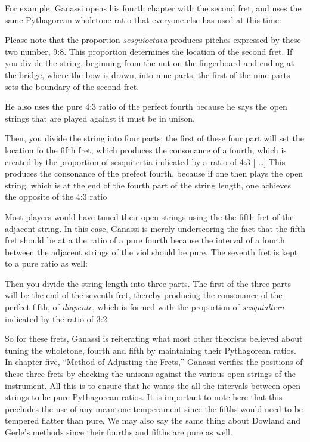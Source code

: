 For example, Ganassi opens his fourth chapter with the second fret, and uses the same
Pythagorean wholetone ratio that everyone else has used at this time:
\begin{blocks}
Please note that the proportion \emph{sesquioctava} produces pitches expressed
by these two number, 9:8.  This proportion determines the location of the second
fret.  If you divide the string, beginning from the nut on the fingerboard and
ending at the bridge, where the bow is drawn, into nine parts, the first of the
nine parts sets the boundary of the second fret.
\end{blocks}
He also uses the pure 4:3 ratio of the
perfect fourth because he says the open strings that are played against it must
be in unison.
\begin{blocks}
Then, you divide the string into four parts; the first of these four part will
set the location fo the fifth fret, which produces the consonance of a fourth,
which is created by the proportion of sesquitertia indicated by a ratio of 4:3
[ \ldots ] This produces the consonance of the prefect fourth, because if
one then plays the open string, which is at the end of the fourth part of the
string length, one achieves the opposite of the 4:3 ratio
\end{blocks}
Most players would have tuned their open strings using the the fifth fret of the
adjacent string.  In this case, Ganassi is merely underscoring the fact that the fifth
fret should be at a the ratio of a pure fourth because the interval of a fourth between
the adjacent strings of the viol should be pure. The seventh fret is kept to a pure
ratio as well:
\begin{blocks}
Then you divide the string length into three parts. The first of the three parts will
be the end of the seventh fret, thereby producing the consonance of the perfect fifth,
of \textit{diapente}, which is formed with the proportion of \textit{sesquialtera}
indicated by the ratio of 3:2.
\end{blocks}

So for these frets, Ganassi is reiterating what most other theorists believed about
tuning the wholetone, fourth and fifth by maintaining their Pythagorean ratios. In
chapter five, ``Method of Adjusting the Frets,'' Ganassi verifies the positions of
these three frets by checking the unisons against the various open strings of the
instrument.  All this is to ensure that he wants the all the intervals between open
strings to be pure Pythagorean ratios.  It is important to note here that this
precludes the use of any meantone temperament since the fifths would need to be
tempered flatter than pure.  We may also say the same thing about Dowland and Gerle's
methods since their fourths and fifths are pure as well.

